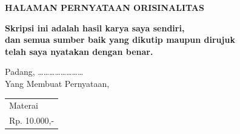 \thispagestyle{frontmatter}
\begin{center}
    {\large\bfseries HALAMAN PERNYATAAN ORISINALITAS}\\[4cm]
    
    \begin{minipage}{0.8\textwidth}
        \centering
        \large\bfseries
        Skripsi ini adalah hasil karya saya sendiri,\\
        dan semua sumber baik yang dikutip maupun dirujuk\\
        telah saya nyatakan dengan benar.
    \end{minipage}
\end{center}

\vspace{5cm}

\begin{flushright}
    Padang, \dots\dots\dots\dots\dots\dots\dots\dots \mhstahun \\[0.2cm]
    Yang Membuat Pernyataan, \\[2cm]
    
    \begin{tabular}{|p{2.5cm}|}
        \hline
        \centering \scriptsize Materai \\ \centering \scriptsize Rp. 10.000,- \\ \hline
    \end{tabular} \\[0.5cm]
    
    \textbf{\MakeUppercase{\mhsname}}
\end{flushright}
\newpage
